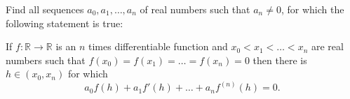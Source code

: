 Find all sequences \(a_{0}, a_{1},\ldots, a_{n}\) of real numbers such that \(a_{n}\neq 0\), for which the following statement is true:

If \(f\colon  \mathbb{R}\to\mathbb{R}\) is an \(n\) times differentiable function
and \(x_{0}<x_{1}<\ldots <x_{n}\) are real numbers such that
\(f(x_{0})=f(x_{1})=\ldots =f(x_{n})=0\) then there is \(h\in (x_{0}, x_{n})\) for which \[a_{0}f(h)+a_{1}f'(h)+\ldots+a_{n}f^{(n)}(h)=0.\]